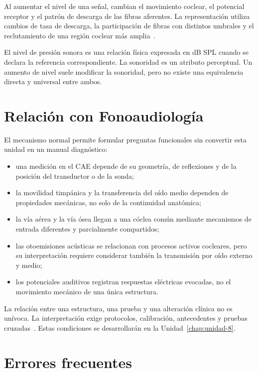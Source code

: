 Al aumentar el nivel de una señal, cambian el movimiento coclear, el
potencial receptor y el patrón de descarga de las fibras aferentes. La
representación utiliza cambios de tasa de descarga, la participación de
fibras con distintos umbrales y el reclutamiento de una región coclear más
amplia~\cite{fettiplace2017,capraraPeng2022}.

El nivel de presión sonora es una relación física expresada en dB SPL cuando
se declara la referencia correspondiente. La sonoridad es un atributo
perceptual. Un aumento de nivel suele modificar la sonoridad, pero no existe
una equivalencia directa y universal entre ambos.

\section{Relación con Fonoaudiología}
\label{sec:u6-relacion-fonoaudiologia}

El mecanismo normal permite formular preguntas funcionales sin convertir
esta unidad en un manual diagnóstico:

\begin{itemize}
    \item una medición en el CAE depende de su geometría, de reflexiones y de
    la posición del transductor o de la sonda;
    \item la movilidad timpánica y la transferencia del oído medio dependen de
    propiedades mecánicas, no solo de la continuidad anatómica;
    \item la vía aérea y la vía ósea llegan a una cóclea común mediante
    mecanismos de entrada diferentes y parcialmente compartidos;
    \item las otoemisiones acústicas se relacionan con procesos activos
    cocleares, pero su interpretación requiere considerar también la
    transmisión por oído externo y medio;
    \item los potenciales auditivos registran respuestas eléctricas evocadas,
    no el movimiento mecánico de una única estructura.
\end{itemize}

La relación entre una estructura, una prueba y una alteración clínica
no es unívoca. La interpretación exige protocolos, calibración, antecedentes
y pruebas cruzadas~\cite{fettiplace2017,capraraPeng2022}. Estas condiciones se desarrollarán en la
Unidad~\ref{chap:unidad-8}.

\section{Errores frecuentes}
\label{sec:u6-errores}

